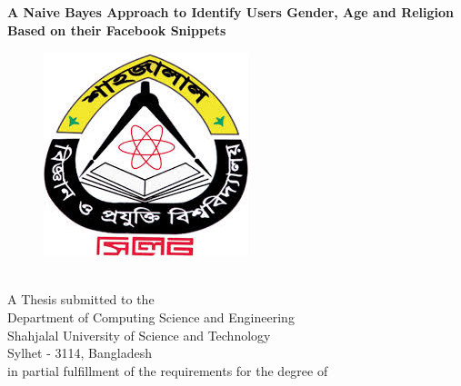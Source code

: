 \documentclass{standalone}
\begin{document}
\begin{titlepage}
\begin{center}
				\newpage
        {\Large \bf A Naive Bayes Approach to Identify Users Gender, Age and Religion Based on their Facebook Snippets}
        \begin{figure}[h]
				\centering
				\includegraphics[scale=0.6]{./img/varsityLogo}
				\end{figure}\\
				A Thesis	
submitted to the \\
        {\large Department of Computing Science and Engineering}\\
        {\Large Shahjalal University of Science and Technology}\\
        Sylhet - 3114, Bangladesh\\

in partial fulfillment of the
requirements for the degree of \\
        

\end{center}
\end{titlepage}
\end{document}
